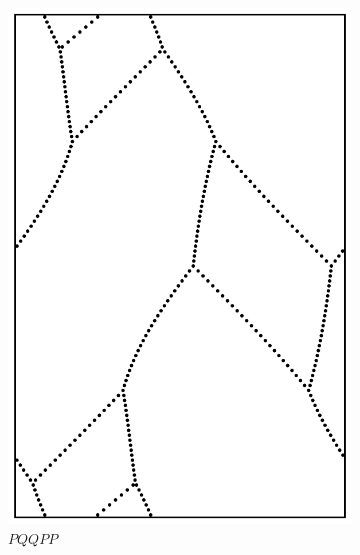 \documentclass[12pt,twoside]{reedthesis}
\theoremstyle{definition}
\begin{document}
\begin{figure}[h]
\begin{subfigure}[t]{0.24\textwidth}
    \includegraphics[width=\textwidth]{figures/string_cheese_appendix/pqqpp.pdf}
    \caption*{$PQQPP$}
    \vspace{5mm}
  \end{subfigure}
  \hfill
  \begin{subfigure}[t]{0.24\textwidth}

\end{subfigure}
\end{figure}
\end{document}
